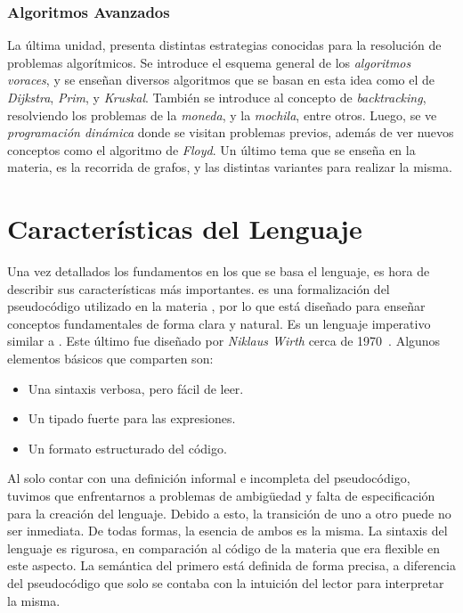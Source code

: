 \subsubsection{Algoritmos Avanzados}

La última unidad, presenta distintas estrategias conocidas para la resolución de problemas algorítmicos.
Se introduce el esquema general de los \textit{algoritmos voraces}, y se enseñan diversos algoritmos que se basan en esta idea como el de \textit{Dijkstra}, \textit{Prim}, y \textit{Kruskal}.
También se introduce al concepto de \textit{backtracking}, resolviendo los problemas de la \textit{moneda}, y la \textit{mochila}, entre otros.
Luego, se ve \textit{programación dinámica} donde se visitan problemas previos, además de ver nuevos conceptos como el algoritmo de \textit{Floyd}.
Un último tema que se enseña en la materia, es la recorrida de grafos, y las distintas variantes para realizar la misma.

\section{Características del Lenguaje}

Una vez detallados los fundamentos en los que se basa el lenguaje, es hora de describir sus características más importantes.
\Lenguaje{} es una formalización del pseudocódigo utilizado en la materia \Materia{}, por lo que está diseñado para enseñar conceptos fundamentales de forma clara y natural.
Es un lenguaje imperativo similar a \Pascal{}.
Este último fue diseñado por \textit{Niklaus Wirth} cerca de 1970~\cite{Pascal}.
Algunos elementos básicos que comparten son:
\begin{itemize}
    \item Una sintaxis verbosa, pero fácil de leer.
    \item Un tipado fuerte para las expresiones.
    \item Un formato estructurado del código.
\end{itemize}

Al solo contar con una definición informal e incompleta del pseudocódigo, tuvimos que enfrentarnos a problemas de ambigüedad y falta de especificación para la creación del lenguaje.
Debido a esto, la transición de uno a otro puede no ser inmediata.
De todas formas, la esencia de ambos es la misma.
La sintaxis del lenguaje es rigurosa, en comparación al código de la materia que era flexible en este aspecto.
La semántica del primero está definida de forma precisa, a diferencia del pseudocódigo que solo se contaba con la intuición del lector para interpretar la misma.

